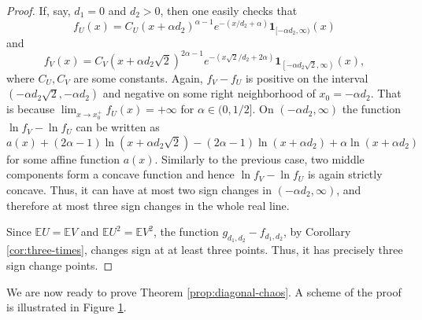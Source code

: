 \documentclass[11pt]{amsart}
\newcommand{\1}{\mathbf{1}}
\newcommand{\E}{\mathbb{E}}
\theoremstyle{definition}
\theoremstyle{definition}
\theoremstyle{remark}
\begin{document}
\begin{proof}
If, say, $d_1=0$ and $d_2>0$, then one easily checks that
\[
	f_U(x) = C_U (x+\alpha d_2)^{\alpha-1}e^{-(x/d_2+\alpha)}  \1_{[-\alpha d_2,\infty)}(x)
\]
and
\[ 
    f_{V}(x) = C_V \left(x+\alpha d_2 \sqrt2\right)^{2\alpha-1}e^{-\left(x\sqrt{2}/d_2+2\alpha\right)} \1_{\left[-\alpha d_2 \sqrt{2},\infty\right)}(x),
\]
where $C_U, C_V$ are some constants. Again, $f_{V}-f_{U}$ is positive on the interval $(-\alpha d_2 \sqrt{2}, -\alpha d_2)$ and negative on some right neighborhood of $x_0=-\alpha d_2$. That is because $\lim_{x \to x_0^+} f_{U}(x)=+\infty$ for $\alpha\in(0,1/2]$. On $(-\alpha d_2, \infty)$ the function $\ln f_{V}- \ln f_{U}$ can be written as
\[
    a(x) + (2\alpha-1)\ln(x+\alpha d_2 \sqrt2) - (2\alpha-1)\ln(x+\alpha d_2) + \alpha\ln(x+\alpha d_2)
\]
for some affine function $a(x)$. Similarly to the previous case, two middle components form a concave function and hence $\ln f_{V}- \ln f_{U}$ is again strictly concave. Thus, it can have at most two sign changes in $(-\alpha d_2,\infty)$, and therefore at most three sign changes in the whole real line.  

Since $\E U = \E V$ and $\E U^2 = \E V^2$, the function $g_{d_1, d_2}-f_{d_1, d_2}$, by Corollary \ref{cor:three-times}, changes sign at at least three points. Thus, it has  precisely three sign change points.
\end{proof}


We are now ready to prove Theorem \ref{prop:diagonal-chaos}. A scheme of the proof is illustrated in Figure \ref{fig:1}.

\begin{figure}[omitted: a diagram of this paper's results, not reproduced here]\label{fig:1}\end{figure}
\end{document}
